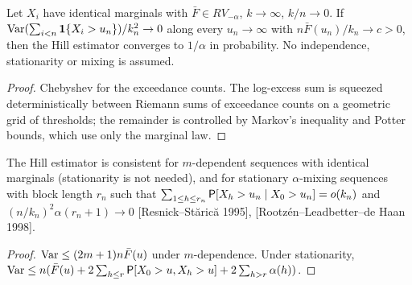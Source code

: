 \begin{theorem}
  \label{thm:hill-variance}
  \leanok
  Let $X_i$ have identical marginals with $\bar F \in RV_{-\alpha}$, $k \to \infty$, $k/n \to 0$. If
  $\operatorname{Var}(\sum_{i<n} \mathbf 1\{X_i > u_n\}) / k_n^2 \to 0$ along every $u_n \to \infty$ with
  $n \bar F(u_n)/k_n \to c > 0$, then the Hill estimator converges to $1/\alpha$ in probability. No
  independence, stationarity or mixing is assumed.
\end{theorem}
\begin{proof}
  \leanok
  Chebyshev for the exceedance counts. The log-excess sum is squeezed deterministically between Riemann
  sums of exceedance counts on a geometric grid of thresholds; the remainder is controlled by Markov's
  inequality and Potter bounds, which use only the marginal law.
\end{proof}

\begin{theorem}
  \label{thm:hill-dependent}
  \leanok
  The Hill estimator is consistent for $m$-dependent sequences with identical marginals (stationarity is
  not needed), and for stationary $\alpha$-mixing sequences with block length $r_n$ such that
  $\sum_{1 \le h \le r_n} \mathsf{P}[X_h > u_n \mid X_0 > u_n] = o(k_n)$ and $(n/k_n)^2 \alpha(r_n + 1) \to 0$
  [Resnick--St\u{a}ric\u{a} 1995], [Rootz\'en--Leadbetter--de Haan 1998].
\end{theorem}
\begin{proof}
  \leanok
  $\operatorname{Var} \le (2m+1) n \bar F(u)$ under $m$-dependence. Under stationarity,
  $\operatorname{Var} \le n(\bar F(u) + 2\sum_{h \le r} \mathsf{P}[X_0 > u, X_h > u] + 2 \sum_{h > r} \alpha(h))$.
\end{proof}

